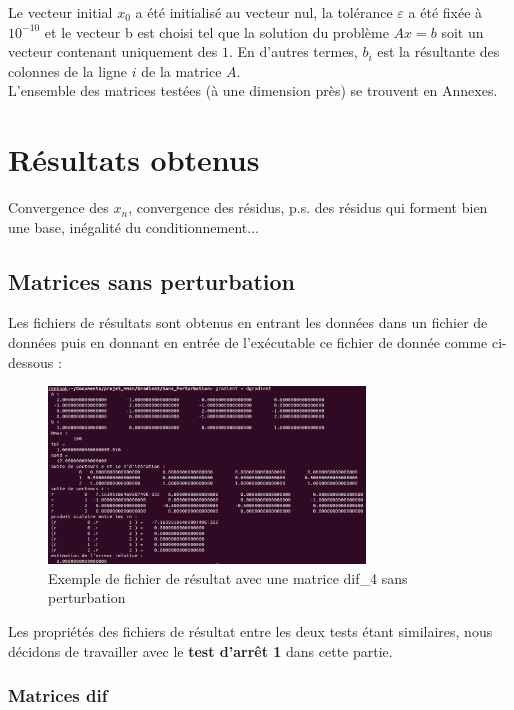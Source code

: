 \documentclass[12,french]{report}
\begin{document}
Le vecteur initial $x_{0}$ a été initialisé au vecteur nul, la tolérance $\varepsilon$ a été fixée à $10^{-10}$ et le vecteur b est choisi tel que la solution du problème $Ax=b$ soit un vecteur contenant uniquement des $1$. En d'autres termes, $b_{i}$ est la résultante des colonnes de la ligne $i$ de la matrice $A$.\\

L'ensemble des matrices testées (à une dimension près) se trouvent en Annexes.

\section{Résultats obtenus}

Convergence des $x_{n}$, convergence des résidus, p.s. des résidus qui forment bien une base, inégalité du conditionnement...

\subsection{Matrices sans perturbation}

Les fichiers de résultats sont obtenus en entrant les données dans un fichier de données puis en donnant en entrée de l’exécutable ce fichier de donnée comme ci-dessous :
\begin{figure}[H]
	\centering
	\includegraphics[width=0.75\textwidth]{./Images/dif_4.res}
	\caption{Exemple de fichier de résultat avec une matrice dif\_4 sans perturbation}
\end{figure}

Les propriétés des fichiers de résultat entre les deux tests étant similaires, nous décidons de travailler avec le \textbf{test d'arrêt 1} dans cette partie.


\subsubsection{Matrices dif}
\end{document}
